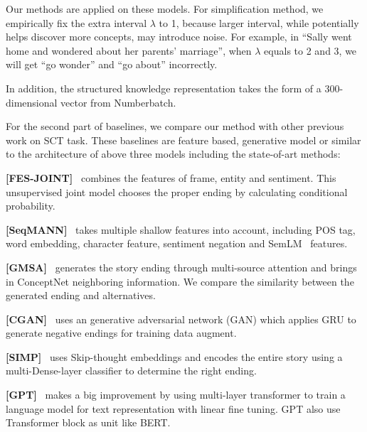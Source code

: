 Our methods are applied on these models. 
For simplification method, we empirically fix the extra interval $\lambda$ to 1, 
because larger interval, while potentially helps discover more
concepts, may introduce noise. 
For example, in 
``Sally went home and wondered about her parents' marriage'', 
when $\lambda$ equals to 2 and 3, we will get ``go wonder'' and 
``go about'' incorrectly.

In addition, the structured knowledge representation takes the form of a 
300-dimensional vector from Numberbatch. 

For the second part of baselines, we compare
our method with other previous work on SCT task. 
These baselines are feature based, generative model or similar to the architecture of above three models including the 
state-of-art methods: 


\textbf{[FES-JOINT]}~\cite{peng2017joint} combines the features of frame, 
entity and sentiment. This unsupervised joint model chooses the proper ending by 
calculating conditional probability.

\textbf{[SeqMANN]}~\cite{li2018multi} takes multiple shallow features into account, 
including POS tag, word embedding, character feature, 
sentiment negation and SemLM~\cite{peng2016two} features.

\textbf{[GMSA]}~\cite{guan2018story} generates the story ending through 
multi-source attention and brings in ConceptNet neighboring information.
We compare the similarity between the generated ending and alternatives.

\textbf{[CGAN]}~\cite{wang2017conditional} uses an generative adversarial 
network (GAN) which applies GRU to generate negative endings for 
training data augment.

\textbf{[SIMP]}~\cite{srinivasan2018simple} uses Skip-thought embeddings and 
encodes the entire story using a multi-Dense-layer classifier to determine the right ending.

\textbf{[GPT]}~\cite{radford2018improving} makes a big improvement by using 
multi-layer transformer to train a language model for text representation 
with linear fine tuning. GPT also use Transformer block as unit like BERT.

